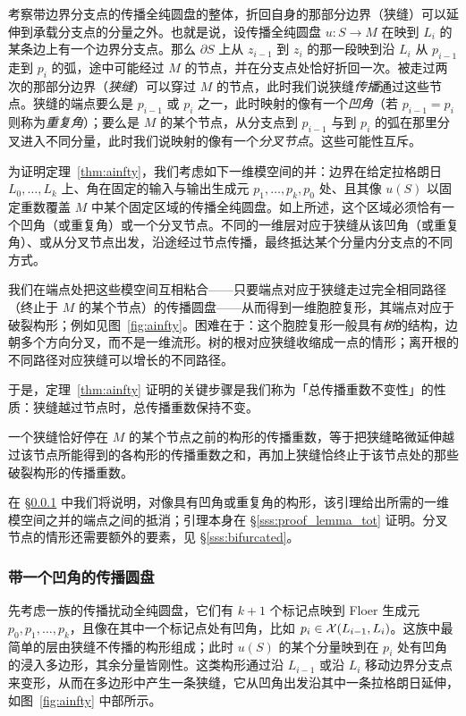 考察带边界分支点的传播全纯圆盘的整体，折回自身的那部分边界（狭缝）可以延伸到承载分支点的分量之外。也就是说，设传播全纯圆盘 $u:S\to M$ 在映到 $L_i$ 的某条边上有一个边界分支点。那么 $\partial S$ 上从 $z_{i-1}$ 到 $z_i$ 的那一段映到沿 $L_i$ 从 $p_{i-1}$ 走到 $p_i$ 的弧，途中可能经过 $M$ 的节点，并在分支点处恰好折回一次。被走过两次的那部分边界（\emph{狭缝}）可以穿过 $M$ 的节点，此时我们说狭缝\emph{传播}通过这些节点。狭缝的端点要么是 $p_{i-1}$ 或 $p_i$ 之一，此时映射的像有一个\emph{凹角}（若 $p_{i-1}=p_i$ 则称为\emph{重复角}）；要么是 $M$ 的某个节点，从分支点到 $p_{i-1}$ 与到 $p_i$ 的弧在那里分叉进入不同分量，此时我们说映射的像有一个\emph{分叉节点}。这些可能性互斥。

为证明定理~\ref{thm:ainfty}，我们考虑如下一维模空间的并：边界在给定拉格朗日 $L_0,\dots,L_k$ 上、角在固定的输入与输出生成元 $p_1,\dots,p_k,p_0$ 处、且其像 $u(S)$ 以固定重数覆盖 $M$ 中某个固定区域的传播全纯圆盘。如上所述，这个区域必须恰有一个凹角（或重复角）或一个分叉节点。不同的一维层对应于狭缝从该凹角（或重复角）、或从分叉节点出发，沿途经过节点传播，最终抵达某个分量内分支点的不同方式。

我们在端点处把这些模空间互相粘合——只要端点对应于狭缝走过完全相同路径（终止于 $M$ 的某个节点）的传播圆盘——从而得到一维胞腔复形，其端点对应于破裂构形；例如见图~\ref{fig:ainfty}。困难在于：这个胞腔复形一般具有\emph{树}的结构，边朝多个方向分叉，而不是一维流形。树的根对应狭缝收缩成一点的情形；离开根的不同路径对应狭缝可以增长的不同路径。

于是，定理~\ref{thm:ainfty} 证明的关键步骤是我们称为「总传播重数不变性」的性质：狭缝越过节点时，总传播重数保持不变。

\begin{lemma}\label{l:tot_mult_invariance}
一个狭缝恰好停在 $M$ 的某个节点之前的构形的传播重数，等于把狭缝略微延伸越过该节点所能得到的各构形的传播重数之和，再加上狭缝恰终止于该节点处的那些破裂构形的传播重数。
\end{lemma}

在 §\ref{sss:concave} 中我们将说明，对像具有凹角或重复角的构形，该引理给出所需的一维模空间之并的端点之间的抵消；引理本身在 §\ref{sss:proof_lemma_tot} 证明。分叉节点的情形还需要额外的要素，见 §\ref{sss:bifurcated}。

\subsubsection{带一个凹角的传播圆盘}\label{sss:concave}

先考虑一族的传播扰动全纯圆盘，它们有 $k+1$ 个标记点映到 Floer 生成元 $p_0,p_1,\dots,p_k$，且像在其中一个标记点处有凹角，比如 $p_i\in\mathcal{X}(L_{i-1},L_i)$。这族中最简单的层由狭缝不传播的构形组成；此时 $u(S)$ 的某个分量映到在 $p_i$ 处有凹角的浸入多边形，其余分量皆刚性。这类构形通过沿 $L_{i-1}$ 或沿 $L_i$ 移动边界分支点来变形，从而在多边形中产生一条狭缝，它从凹角出发沿其中一条拉格朗日延伸，如图~\ref{fig:ainfty} 中部所示。

